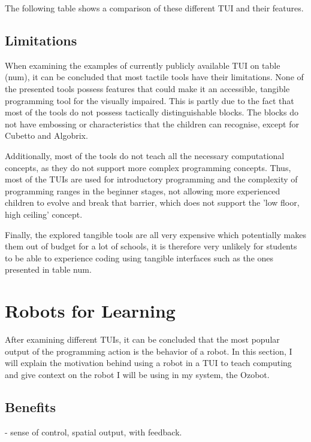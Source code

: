 \documentclass[oneside,%
                    author={Malak Hajji},
                    degree={BSc},
                    title={Designing An Accessible Computational Toolkit For Students},
                  subtitle={With Mixed Visual Abilities}]{dissertation}
\begin{document}
The following table shows a comparison of these different TUI and their features.


\subsection{Limitations}
When examining the examples of currently publicly available TUI on table (num), it can be concluded that most tactile tools have their limitations. None of the presented tools possess features that could make it an accessible, tangible programming tool for the visually impaired. This is partly due to the fact that most of the tools do not possess tactically distinguishable blocks. The blocks do not have embossing or characteristics that the children can recognise, except for Cubetto and Algobrix. 

Additionally, most of the tools do not teach all the necessary computational concepts, as they do not support more complex programming concepts. Thus, most of the TUIs are used for introductory programming and the complexity of programming ranges in the beginner stages, not allowing more experienced children to evolve and break that barrier, which does not support the 'low floor, high ceiling' concept. 

Finally, the explored tangible tools are all very expensive which potentially makes them out of budget for a lot of schools, it is therefore very unlikely for students to be able to experience coding using tangible interfaces such as the ones presented in table num.

\section{Robots for Learning}

After examining different TUIs, it can be concluded that the most popular output of the programming action is the behavior of a robot. In this section, I will explain the motivation behind using a robot in a TUI to teach computing and give context on the robot I will be using in my system, the Ozobot.

\subsection{Benefits}
- sense of control, spatial output, with feedback.
\end{document}
